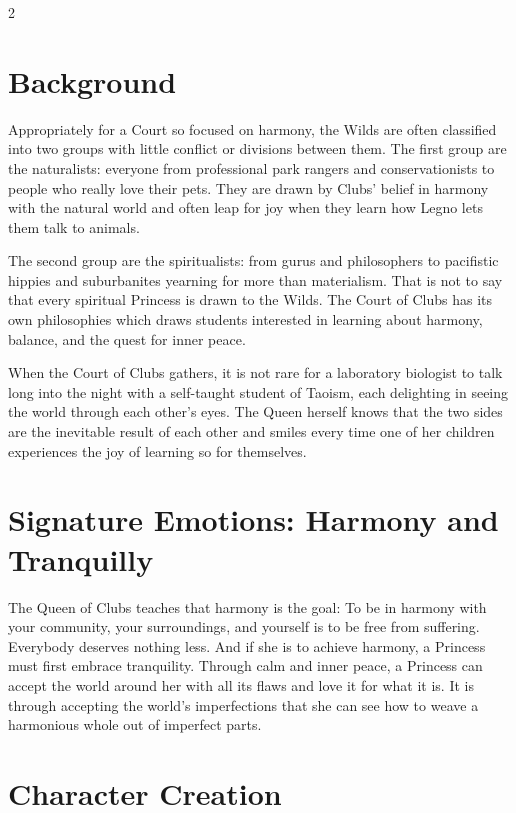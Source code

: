 \begin{multicols}{2}
\section*{Background}

Appropriately for a Court so focused on harmony, the Wilds are often classified into two groups with little conflict or divisions between them. The first group are the naturalists: everyone from professional park rangers and conservationists to people who really love their pets. They are drawn by Clubs' belief in harmony with the natural world and often leap for joy when they learn how Legno lets them talk to animals. 

The second group are the spiritualists: from gurus and philosophers to pacifistic hippies and suburbanites yearning for more than materialism. That is not to say that every spiritual Princess is drawn to the Wilds. The Court of Clubs has its own philosophies which draws students interested in learning about harmony, balance, and the quest for inner peace.

When the Court of Clubs gathers, it is not rare for a laboratory biologist to talk long into the night with a self-taught student of Taoism, each delighting in seeing the world through each other's eyes. The Queen herself knows that the two sides are the inevitable result of each other and smiles every time one of her children experiences the joy of learning so for themselves. 

\section*{Signature Emotions: Harmony and Tranquilly}

The Queen of Clubs teaches that harmony is the goal: To be in harmony with your community, your surroundings, and yourself is to be free from suffering. Everybody deserves nothing less. And if she is to achieve harmony, a Princess must first embrace tranquility. Through calm and inner peace, a Princess can accept the world around her with all its flaws and love it for what it is. It is through accepting the world's imperfections that she can see how to weave a harmonious whole out of imperfect parts.

\section*{Character Creation}


\end{multicols}
